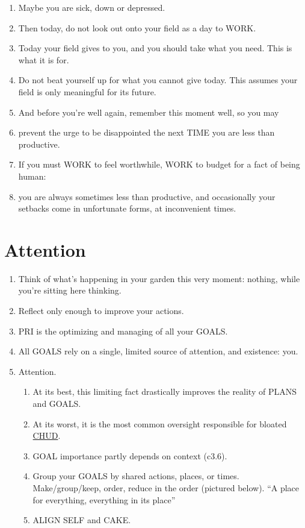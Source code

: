 \documentclass[
]{book}
\providecommand{\tightlist}{%
  \setlength{\itemsep}{0pt}\setlength{\parskip}{0pt}}
\begin{document}
\begin{enumerate}
\def\labelenumi{\arabic{enumi}.}
\setcounter{enumi}{29}
\tightlist
\item
  Maybe you are sick, down or depressed.
\item
  Then today, do not look out onto your field as a day to WORK.
\item
  Today your field gives to you, and you should take what you need. This is what it
  is for.
\item
  Do not beat yourself up for what you cannot give today. This assumes your field
  is only meaningful for its future.
\item
  And before you're well again, remember this moment well, so you may
\item
  prevent the urge to be disappointed the next TIME you are less than productive.
\item
  If you must WORK to feel worthwhile, WORK to budget for a fact of being
  human:
\item
  you are always sometimes less than productive, and occasionally your setbacks
  come in unfortunate forms, at inconvenient times.
\end{enumerate}

\hypertarget{attention}{%
\section{Attention}\label{attention}}

\begin{enumerate}
\def\labelenumi{\arabic{enumi}.}
\setcounter{enumi}{30}
\item
  Think of what's happening in your garden this very moment: nothing, while
  you're sitting here thinking.
\item
  Reflect only enough to improve your actions.
\item
  PRI is the optimizing and managing of all your GOALS.
\item
  All GOALS rely on a single, limited source of attention, and existence: you.
\item
  Attention.

  \begin{enumerate}
  \def\labelenumii{\arabic{enumii}.}
  \tightlist
  \item
    At its best, this limiting fact drastically improves the reality of PLANS and GOALS.
  \item
    At its worst, it is the most common oversight responsible for bloated \protect\hyperlink{c.h.u.d.}{CHUD}.
  \item
    GOAL importance partly depends on context (c3.6).
  \item
    Group your GOALS by shared actions, places, or times. Make/group/keep,
    order, reduce in the order (pictured below). ``A place for everything,
    everything in its place''
  \item
    ALIGN SELF and CAKE.
  \end{enumerate}
\end{enumerate}
\end{document}
